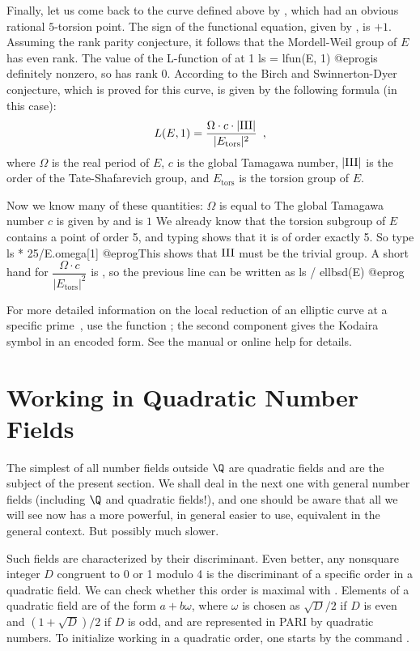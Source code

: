 Finally, let us come back to the curve  defined above by
, which had an obvious rational $5$-torsion
point. The sign of the functional equation, given by , is
$+1$. Assuming the rank parity conjecture, it follows that the Mordell-Weil
group of $E$ has even rank. The value of the L-function of  at 1
\bprog
  ls = lfun(E, 1)
@eprog\noindent is definitely nonzero, so  has rank $0$. According to
the Birch and Swinnerton-Dyer conjecture, which is proved for this curve,
 is given by the following formula (in this case):
%
\def\sha{\hbox{III}}
$$L(E,1)=\dfrac{\Omega\cdot c\cdot|\sha|}{|E_{\text{tors}}|^2}\enspace,$$
%
where $\Omega$ is the real period of $E$, $c$ is the global Tamagawa number,
$|\sha|$ is the order of the Tate-Shafarevich group, and $E_{\text{tors}}$ is the
torsion group of $E$.

Now we know many of these quantities: $\Omega$ is equal to 
The global Tamagawa number $c$ is given by  and is $1$
We already know that the torsion subgroup of $E$ contains a point of order 5,
and typing  shows that it is of order exactly 5. So type
\bprog
  ls * 25/E.omega[1]
@eprog\noindent This shows that $\sha$ must be the trivial group.
A short hand for $\dfrac{\Omega\cdot c}{|E_{\text{tors}}|^2}$ is ,
so the previous line can be written as
\bprog
 ls / ellbsd(E)
@eprog

For more detailed information on the local reduction of an elliptic curve at
a specific prime~, use the function ; the second
component gives the Kodaira symbol in an encoded form.  See the manual or
online help for details.

\section{Working in Quadratic Number Fields}

The simplest of all number fields outside $\Q$ are quadratic fields and are
the subject of the present section. We shall deal in the next one with
general number fields (including $\Q$ and quadratic fields!), and one should
be aware that all we will see now has a more powerful, in general easier to
use, equivalent in the general context. But possibly much slower.

Such fields are characterized by their discriminant. Even better, any
nonsquare integer $D$ congruent to 0 or 1 modulo 4 is the discriminant of a
specific order in a quadratic field. We can check whether this order is
maximal with . Elements of a quadratic field are of the
form $a+b\omega$, where $\omega$ is chosen as $\sqrt{D}/2$ if $D$ is even and
$(1+\sqrt{D})/2$ if $D$ is odd, and are represented in PARI by quadratic
numbers. To initialize working in a quadratic order, one starts by the
command .

